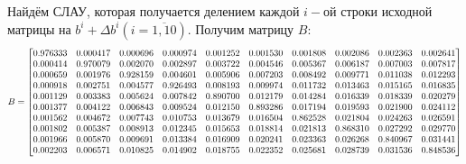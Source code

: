 \documentclass[14pt,a4paper]{scrartcl}
\newcommand\scalemath[2]{\scalebox{#1}{\mbox{\ensuremath{\displaystyle #2}}}}
\begin{document}
Найдём СЛАУ, которая получается делением каждой $i-$ой строки исходной матрицы на $b^i + \Delta b^i (i=\overline{1,10})$. Получим матрицу $B$:
\begin{equation*}
\scalemath{0.75}
{
	B = 
	\begin{bmatrix}{}
	0.976333 & 0.000417 & 0.000696 & 0.000974 & 0.001252 & 0.001530 & 0.001808 & 0.002086 & 0.002363 & 0.002641 \\ 
	0.000414 & 0.970079 & 0.002070 & 0.002897 & 0.003722 & 0.004546 & 0.005367 & 0.006187 & 0.007003 & 0.007817 \\ 
	0.000659 & 0.001976 & 0.928159 & 0.004601 & 0.005906 & 0.007203 & 0.008492 & 0.009771 & 0.011038 & 0.012293 \\ 
	0.000918 & 0.002751 & 0.004577 & 0.926493 & 0.008193 & 0.009974 & 0.011732 & 0.013463 & 0.015165 & 0.016835 \\ 
	0.001129 & 0.003383 & 0.005624 & 0.007842 & 0.890700 & 0.012179 & 0.014284 & 0.016339 & 0.018339 & 0.020279 \\ 
	0.001377 & 0.004122 & 0.006843 & 0.009524 & 0.012150 & 0.893286 & 0.017194 & 0.019593 & 0.021900 & 0.024112 \\ 
	0.001562 & 0.004672 & 0.007743 & 0.010753 & 0.013679 & 0.016504 & 0.862528 & 0.021804 & 0.024263 & 0.026591 \\ 
	0.001802 & 0.005387 & 0.008913 & 0.012345 & 0.015653 & 0.018814 & 0.021813 & 0.868310 & 0.027292 & 0.029770 \\ 
	0.001966 & 0.005870 & 0.009691 & 0.013384 & 0.016909 & 0.020241 & 0.023363 & 0.026268 & 0.840967 & 0.031441 \\ 
	0.002203 & 0.006571 & 0.010825 & 0.014902 & 0.018755 & 0.022352 & 0.025681 & 0.028739 & 0.031536 & 0.848536 \\ 
	\end{bmatrix}
}
\end{equation*}
\end{document}
